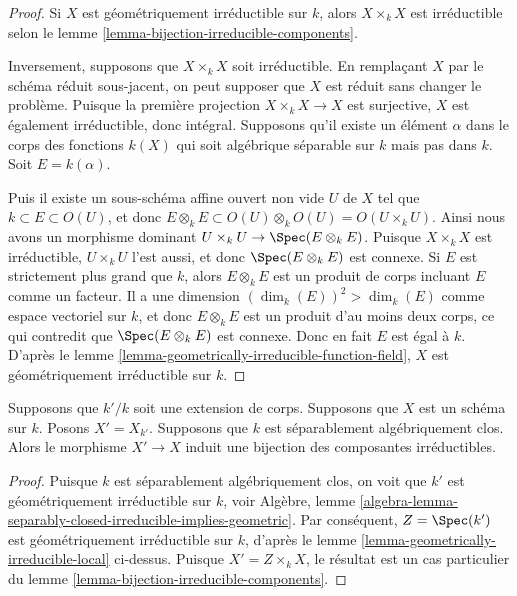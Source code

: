 \begin{proof}
Si $X$ est géométriquement irréductible sur $k$,
alors $X\times_k X$ est irréductible selon le
lemme \ref{lemma-bijection-irreducible-components}.

\medskip\noindent
Inversement, supposons que $X \times_k X$ soit
irréductible. En remplaçant $X$ par le schéma réduit
sous-jacent, on peut supposer que $X$ est réduit sans
changer le problème. Puisque la première projection $X
\times_k X \to X$ est surjective, $X$ est également
irréductible, donc intégral. Supposons qu'il existe un élément
$\alpha$ dans le corps des fonctions $k(X)$ qui soit
algébrique séparable sur $k$ mais pas dans $k$. Soit $E = k(\alpha)$.

\medskip\noindent
Puis il existe un sous-schéma affine ouvert non vide $U$ de $X$
tel que $k \subset E \subset O(U)$, et donc $E \otimes_k E
\subset O(U)\otimes_k O(U) = O(U\times_k U)$. Ainsi nous avons
un morphisme dominant $U \times_k U \to \Spec(E\otimes_k E)$.
Puisque $X\times_k X$ est irréductible, $U \times_k U$ l'est
aussi, et donc $\Spec(E \otimes_k E)$ est connexe. Si $E$ est
strictement plus grand que $k$, alors $E \otimes_k E$ est un
produit de corps incluant $E$ comme un facteur. Il a une
dimension $(\dim_k(E))^2>\dim_k(E)$ comme espace vectoriel sur
$k$, et donc $E\otimes_k E$ est un produit d'au moins deux corps,
ce qui contredit que $\Spec(E \otimes_k E)$ est connexe. Donc en
fait $E$ est égal à $k$. D'après le lemme
\ref{lemma-geometrically-irreducible-function-field}, $X$ est géométriquement irréductible sur $k$.
\end{proof}

\begin{lemma}
\label{lemma-separably-closed-field-irreducible-components}
Supposons que $k'/k$ soit une extension de corps. Supposons que
$X$ est un schéma sur $k$. Posons $X' = X_{k'}$. Supposons que
$k$ est séparablement algébriquement clos. Alors le morphisme
$X' \to X$ induit une bijection des composantes irréductibles.
\end{lemma}

\begin{proof}
Puisque $k$ est séparablement algébriquement clos, on voit que
$k'$ est géométriquement irréductible sur $k$, voir Algèbre, lemme
\ref{algebra-lemma-separably-closed-irreducible-implies-geometric}.
Par conséquent, $Z = \Spec(k')$ est géométriquement irréductible
sur $k$, d'après le lemme
\ref{lemma-geometrically-irreducible-local} ci-dessus. Puisque $X' = Z \times_k X$, le
résultat est un cas particulier du lemme \ref{lemma-bijection-irreducible-components}.
\end{proof}

